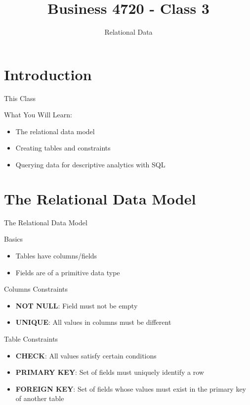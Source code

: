 \documentclass[ignorenonframetext,xcolor=x11names]{beamer}
\title{Business 4720 - Class 3}
\subtitle{Relational Data}
\begin{document}
\begin{frame}[label=full]{}
  \titlepage
  \footnotesize
  
\end{frame}

\section{Introduction}

\begin{frame}[label=full]{This Class}

\begin{block}{What You Will Learn:}
\begin{itemize}
  \item The relational data model
  \item Creating tables and constraints
  \item Querying data for descriptive analytics with SQL
\end{itemize}
\end{block}
\end{frame}

\section{The Relational Data Model}

\begin{frame}[label=full]{The Relational Data Model}

\begin{block}{Basics}
\begin{itemize}
	\item Tables have columns/fields
	\item Fields are of a primitive data type
\end{itemize}
\end{block}
\begin{block}{Columns Constraints}
\begin{itemize}
	\item \textbf{NOT NULL}: Field must not be empty
	\item \textbf{UNIQUE}: All values in columns must be different
\end{itemize}
\end{block}
\begin{block}{Table Constraints}
\begin{itemize}
	\item \textbf{CHECK}: All values satisfy certain conditions
	\item \textbf{PRIMARY KEY}: Set of fields must uniquely identify a row
	\item \textbf{FOREIGN KEY}: Set of fields whose values must exist in the primary key of another table
\end{itemize}
\end{block}
\end{frame}
\end{document}
